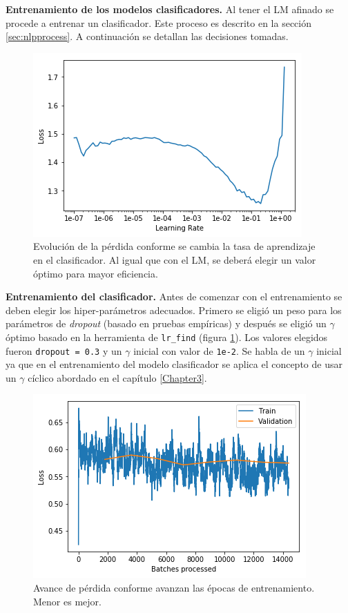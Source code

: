 \textbf{Entrenamiento de los modelos clasificadores.} Al tener el LM afinado se procede a entrenar un clasificador. Este proceso es descrito en la sección \ref{sec:nlpprocess}. A continuación se detallan las decisiones tomadas.

\begin{figure}
\centering
\includegraphics[scale=1]{Figures/clas_lrfinder.png}
\caption{Evolución de la pérdida conforme se cambia la tasa de aprendizaje en el clasificador. Al igual que con el LM, se deberá elegir un valor óptimo para mayor eficiencia.}
\label{fig:claslr}
\end{figure}

\textbf{Entrenamiento del clasificador.} Antes de comenzar con el entrenamiento se deben elegir los hiper-parámetros adecuados. Primero se eligió un peso para los parámetros de \textit{dropout} (basado en pruebas empíricas) y después se eligió un $\gamma$ óptimo basado en la herramienta de \texttt{lr\_find} (figura \ref{fig:claslr}). Los valores elegidos fueron \texttt{dropout = 0.3} y un $\gamma$ inicial con valor de \texttt{1e-2}. Se habla de un $\gamma$ inicial ya que en el entrenamiento del modelo clasificador se aplica el concepto de usar un $\gamma$ cíclico \parencite{smith2017convergence} abordado en el capítulo \ref{Chapter3}.

\begin{figure}
\centering
\includegraphics[scale=1]{Figures/clas_epochs.png}
\caption{Avance de pérdida conforme avanzan las épocas de entrenamiento. Menor es mejor.}
\label{fig:clasepochs}
\end{figure}

